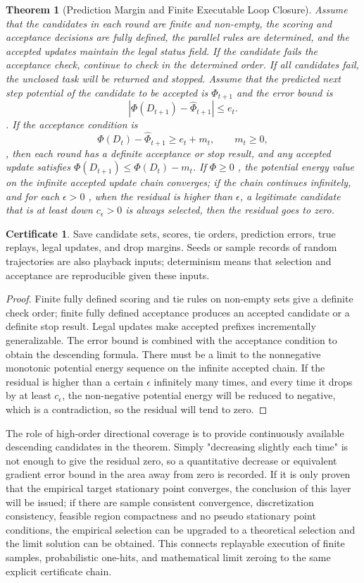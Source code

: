 \documentclass[11pt,a4paper]{article}
\theoremstyle{plain}
\newtheorem{theorem}{Theorem}[section]
\theoremstyle{definition}
\newtheorem*{certificate}{Certificate}
\theoremstyle{remark}
\begin{document}
\begin{CJK*}
\begin{theorem}
[Prediction Margin and Finite Executable Loop Closure]\label{ss:tph}
Assume that the candidates in each round are finite and non-empty, the scoring and acceptance decisions are fully defined, the parallel rules are determined, and the accepted updates maintain the legal status field. If the candidate fails the acceptance check, continue to check in the determined order. If all candidates fail, the unclosed task will be returned and stopped. Assume that the predicted next step potential of the candidate to be accepted is $\widehat\Phi_{t+1}$ and the error bound is \[
 |\Phi(D_{t+1})-\widehat\Phi_{t+1}|\le e_t.
\]. If the acceptance condition is \[
 \Phi(D_t)-\widehat\Phi_{t+1}\ge e_t+m_t,\qquad m_t\ge0,
\], then each round has a definite acceptance or stop result, and any accepted update satisfies $\Phi(D_{t+1})\le\Phi(D_t)-m_t$. If $\Phi\ge0$ , the potential energy value on the infinite accepted update chain converges; if the chain continues infinitely, and for each $\epsilon>0$ , when the residual is higher than $\epsilon$, a legitimate candidate that is at least down $c_\epsilon>0$ is always selected, then the residual goes to zero.\end{theorem}
\begin{certificate}
Save candidate sets, scores, tie orders, prediction errors, true replays, legal updates, and drop margins. Seeds or sample records of random trajectories are also playback inputs; determinism means that selection and acceptance are reproducible given these inputs.\end{certificate}
\begin{proof}
Finite fully defined scoring and tie rules on non-empty sets give a definite check order; finite fully defined acceptance produces an accepted candidate or a definite stop result. Legal updates make accepted prefixes incrementally generalizable. The error bound is combined with the acceptance condition to obtain the descending formula. There must be a limit to the nonnegative monotonic potential energy sequence on the infinite accepted chain. If the residual is higher than a certain $\epsilon$ infinitely many times, and every time it drops by at least $c_\epsilon$, the non-negative potential energy will be reduced to negative, which is a contradiction, so the residual will tend to zero.\end{proof}


The role of high-order directional coverage is to provide continuously available descending candidates in the theorem. Simply "decreasing slightly each time" is not enough to give the residual zero, so a quantitative decrease or equivalent gradient error bound in the area away from zero is recorded. If it is only proven that the empirical target stationary point converges, the conclusion of this layer will be issued; if there are sample consistent convergence, discretization consistency, feasible region compactness and no pseudo stationary point conditions, the empirical selection can be upgraded to a theoretical selection and the limit solution can be obtained. This connects replayable execution of finite samples, probabilistic one-hits, and mathematical limit zeroing to the same explicit certificate chain.


\end{CJK*}
\end{document}

